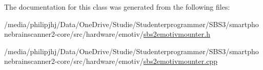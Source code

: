 The documentation for this class was generated from the following files\-:\begin{DoxyCompactItemize}
\item 
/media/philipjhj/\-Data/\-One\-Drive/\-Studie/\-Studenterprogrammør/\-S\-B\-S3/smartphonebrainscanner2-\/core/src/hardware/emotiv/\hyperlink{sbs2emotivmounter_8h}{sbs2emotivmounter.\-h}\item 
/media/philipjhj/\-Data/\-One\-Drive/\-Studie/\-Studenterprogrammør/\-S\-B\-S3/smartphonebrainscanner2-\/core/src/hardware/emotiv/\hyperlink{sbs2emotivmounter_8cpp}{sbs2emotivmounter.\-cpp}\end{DoxyCompactItemize}
